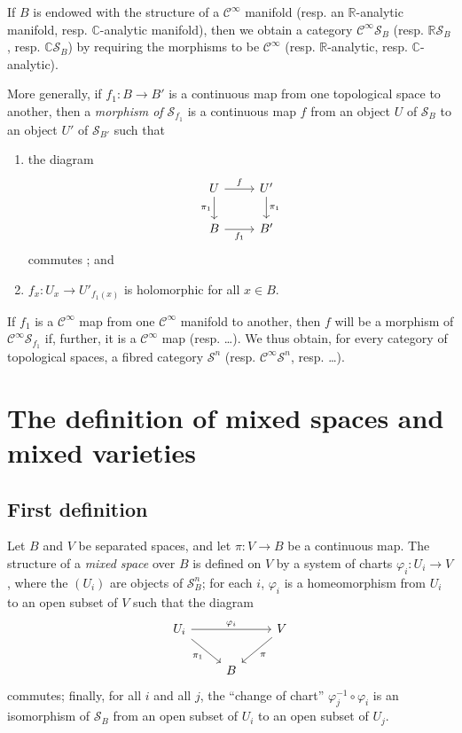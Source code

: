 \documentclass{article}
\newcommand{\RR}{\mathbb{R}}
\newcommand{\CC}{\mathbb{C}}
\newcommand{\oldpage}[1]{\marginpar{\footnotesize$\Big\vert$ \textit{p.~#1}}}
\begin{document}
If $B$ is endowed with the structure of a $\mathscr{C}^\infty$ manifold (resp. an $\RR$-analytic manifold, resp. $\CC$-analytic manifold), then we obtain a category $\mathscr{C}^\infty\mathscr{S}_B$ (resp. $\RR\mathscr{S}_B$, resp. $\CC\mathscr{S}_B$) by requiring the morphisms to be $\mathscr{C}^\infty$ (resp. $\RR$-analytic, resp. $\CC$-analytic).

More generally, if $f_1\colon B\to B'$ is a continuous map from one topological space to another, then a \emph{morphism of $\mathscr{S}_{f_1}$} is a continuous map $f$ from an object $U$ of $\mathscr{S}_B$ to an object $U'$ of $\mathscr{S}_{B'}$ such that
\begin{enumerate}
  \item the diagram
    \[
      \begin{tikzcd}
        U \rar["f"] \dar[swap,"\pi_1"]
        & U' \dar["\pi_1"]
      \\B \rar[swap,"f_1"]
        & B'
      \end{tikzcd}
    \]
    commutes ; and
  \item $f_x\colon U_x\to U'_{f_1(x)}$ is holomorphic for all $x\in B$.
\end{enumerate}

\oldpage{2-02}
If $f_1$ is a $\mathscr{C}^\infty$ map from one $\mathscr{C}^\infty$ manifold to another, then $f$ will be a morphism of $\mathscr{C}^\infty\mathscr{S}_{f_1}$ if, further, it is a $\mathscr{C}^\infty$ map (resp. \ldots).
We thus obtain, for every category of topological spaces, a fibred category $\mathscr{S}^n$ (resp. $\mathscr{C}^\infty\mathscr{S}^n$, resp. \ldots).


\section{The definition of mixed spaces and mixed varieties}
\label{II}

\subsection{First definition}
\label{II.1}

Let $B$ and $V$ be separated spaces, and let $\pi\colon V\to B$ be a continuous map.
The structure of a \emph{mixed space} over $B$ is defined on $V$ by a system of charts $\varphi_i\colon U_i\to V$, where the $(U_i)$ are objects of $\mathscr{S}_B^n$;
for each $i$, $\varphi_i$ is a homeomorphism from $U_i$ to an open subset of $V$ such that the diagram
\[
  \begin{tikzcd}
    U_i \ar[rr,"\varphi_i"] \ar[dr,swap,"\pi_1"]
    && V \ar[dl,"\pi"]
  \\&B&
  \end{tikzcd}
\]
commutes;
finally, for all $i$ and all $j$, the ``change of chart'' $\varphi_j^{-1}\circ\varphi_i$ is an isomorphism of $\mathscr{S}_B$ from an open subset of $U_i$ to an open subset of $U_j$.
\end{document}
